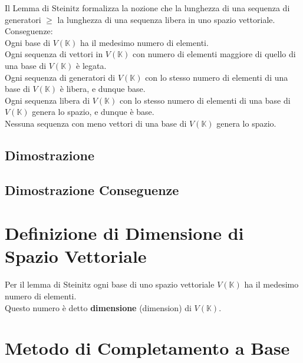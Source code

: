 \documentclass[a4paper, twoside, italian, 11pt]{book}
\newcommand{\K}{\mathbb K}
\begin{document}
Il Lemma di Steinitz formalizza la nozione che la lunghezza di una sequenza di generatori $\geq$ la lunghezza di una sequenza libera in uno spazio vettoriale. \\

\noindent
Conseguenze: \\

\noindent
Ogni base di $V(\K)$ ha il medesimo numero di elementi. \\

\noindent
Ogni sequenza di vettori in $V(\K)$ con numero di elementi maggiore di quello di una base di $V(\K)$ è legata. \\

\noindent
Ogni sequenza di generatori di $V(\K)$ con lo stesso numero di elementi di una base di $V(\K)$ è libera, e dunque base. \\

\noindent
Ogni sequenza libera di $V(\K)$ con lo stesso numero di elementi di una base di $V(\K)$ genera lo spazio, e dunque è base. \\

\noindent
Nessuna sequenza con meno vettori di una base di $V(\K)$ genera lo spazio.


\subsection{Dimostrazione}



\subsection{Dimostrazione Conseguenze}



\section{Definizione di Dimensione di Spazio Vettoriale}

Per il lemma di Steinitz ogni base di uno spazio vettoriale $V(\K)$ ha il medesimo numero di elementi. \\
Questo numero è detto \textbf{dimensione} (dimension) di $V(\K)$.



\section{Metodo di Completamento a Base}
\end{document}

